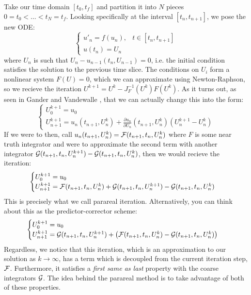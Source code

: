 Take our time domain $[t_0, t_f]$ and partition it into $N$ pieces $0 = t_0 <
\dots < t_N = t_f$. Looking specifically at the interval $[t_n, t_{n+1}]$, we
pose the new ODE:
\[
  \begin{cases}
    u'_n = f(u_n), & t \in [t_n, t_{n+1}] \\
    u(t_n) = U_n
  \end{cases}
\]
where $U_n$ is such that $U_n - u_{n-1}(t_n, U_{n-1}) = 0$, i.e. the initial
condition satisfies the solution to the previous time slice. The conditions on
$U_i$ form a nonlinear system $F(U) = 0$, which we can approximate using
Newton-Raphson, so we recieve the iteration $U^{k+1} = U^k -
J_F^{-1}(U^k)F(U^k)$. As it turns out, as seen in Gander and Vandewalle
\cite{gandervandewalle}, that we can actually change this into the form:
\[
  \begin{cases}
    U_0^{k+1} = u_0 \\
    U_{n+1}^{k+1} = u_n(t_{n+1}, U_n^k) + \frac{\partial u_n}{\partial
    U_n}(t_{n+1}, U_n^k)(U_n^{k+1} - U_n^k)
  \end{cases}
\]
If we were to then, call $u_n(t_{n+1}, U_n^k) = \mathcal{F}(t_{n+1}, t_n, U_n^k)$
where $F$ is some near truth integrator and were to approximate the second
term with another integrator $\mathcal{G}(t_{n+1},t_n,U_n^{k+1}) -
\mathcal{G}(t_{n+1},t_n, U_n^k)$, then we would recieve the iteration:
\[
  \begin{cases}
    U_0^{k+1} = u_0 \\
    U_{n+1}^{k+1} = \mathcal{F}(t_{n+1}, t_n, U_n^k) + \mathcal{G}(t_{n+1},t_n,U_n^{k+1})
    - \mathcal{G}(t_{n+1},t_n, U_n^k)
  \end{cases}
\]
This is precisely what we call parareal iteration. Alternatively, you can think
about this as the predictor-corrector scheme:
\[
  \begin{cases}
    U_0^{k+1} = u_0 \\
    U_{n+1}^{k+1} = \mathcal{G}(t_{n+1},t_n,U_n^{k+1}) + \left(\mathcal{F}(t_{n+1}, t_n,
    U_n^k) - \mathcal{G}(t_{n+1},t_n, U_n^k)\right)
  \end{cases}
\]
Regardless, we notice that this iteration, which is an approximation to our
solution as $k \to \infty$, has a term which is decoupled from the current
iteration step, $\mathcal{F}$. Furthermore, it satisfies a \textit{first same as last}
property with the coarse integrators $\mathcal{G}$. The idea behind the parareal
method is to take advantage of both of these properties.
